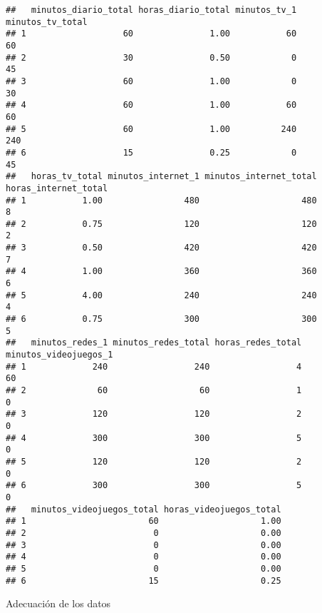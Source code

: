 \documentclass[
]{article}
\newenvironment{Shaded}{\begin{snugshade}}{\end{snugshade}}
\newcommand{\ConstantTok}[1]{\textcolor[rgb]{0.00,0.00,0.00}{#1}}
\newcommand{\DecValTok}[1]{\textcolor[rgb]{0.00,0.00,0.81}{#1}}
\newcommand{\FunctionTok}[1]{\textcolor[rgb]{0.00,0.00,0.00}{#1}}
\newcommand{\NormalTok}[1]{#1}
\newcommand{\OtherTok}[1]{\textcolor[rgb]{0.56,0.35,0.01}{#1}}
\newcommand{\SpecialCharTok}[1]{\textcolor[rgb]{0.00,0.00,0.00}{#1}}
\begin{document}
\begin{verbatim}
##   minutos_diario_total horas_diario_total minutos_tv_1 minutos_tv_total
## 1                   60               1.00           60               60
## 2                   30               0.50            0               45
## 3                   60               1.00            0               30
## 4                   60               1.00           60               60
## 5                   60               1.00          240              240
## 6                   15               0.25            0               45
##   horas_tv_total minutos_internet_1 minutos_internet_total horas_internet_total
## 1           1.00                480                    480                    8
## 2           0.75                120                    120                    2
## 3           0.50                420                    420                    7
## 4           1.00                360                    360                    6
## 5           4.00                240                    240                    4
## 6           0.75                300                    300                    5
##   minutos_redes_1 minutos_redes_total horas_redes_total minutos_videojuegos_1
## 1             240                 240                 4                    60
## 2              60                  60                 1                     0
## 3             120                 120                 2                     0
## 4             300                 300                 5                     0
## 5             120                 120                 2                     0
## 6             300                 300                 5                     0
##   minutos_videojuegos_total horas_videojuegos_total
## 1                        60                    1.00
## 2                         0                    0.00
## 3                         0                    0.00
## 4                         0                    0.00
## 5                         0                    0.00
## 6                        15                    0.25
\end{verbatim}

Adecuación de los datos

\begin{Shaded}
\end{Shaded}
\end{document}
